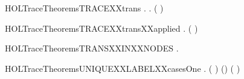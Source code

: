 \newcommand{\HOLTraceTheoremsTRACEXXstrongind}{\UseVerbatim{HOLTraceTheoremsTRACEXXstrongind}}
\begin{SaveVerbatim}{HOLTraceTheoremsTRACEXXtrans}
\HOLTokenTurnstile{} \HOLSymConst{\HOLTokenForall{}}  .     \HOLSymConst{\HOLTokenImp{}} \HOLSymConst{\HOLTokenForall{}} .     \HOLSymConst{\HOLTokenImp{}}   ( \HOLSymConst{++} ) 
\end{SaveVerbatim}
\newcommand{\HOLTraceTheoremsTRACEXXtrans}{\UseVerbatim{HOLTraceTheoremsTRACEXXtrans}}
\begin{SaveVerbatim}{HOLTraceTheoremsTRACEXXtransXXapplied}
\HOLTokenTurnstile{} \HOLSymConst{\HOLTokenForall{}}    .
           \HOLSymConst{\HOLTokenConj{}}     \HOLSymConst{\HOLTokenImp{}}   ( \HOLSymConst{++} ) 
\end{SaveVerbatim}
\newcommand{\HOLTraceTheoremsTRACEXXtransXXapplied}{\UseVerbatim{HOLTraceTheoremsTRACEXXtransXXapplied}}
\begin{SaveVerbatim}{HOLTraceTheoremsTRANSXXINXXNODES}
\HOLTokenTurnstile{} \HOLSymConst{\HOLTokenForall{}}  .  \HOLTokenTransBegin{}\HOLTokenTransEnd {} \HOLSymConst{\HOLTokenImp{}}  \HOLConst{\HOLTokenIn{}}  
\end{SaveVerbatim}
\newcommand{\HOLTraceTheoremsTRANSXXINXXNODES}{\UseVerbatim{HOLTraceTheoremsTRANSXXINXXNODES}}
\begin{SaveVerbatim}{HOLTraceTheoremsUNIQUEXXLABELXXcasesOne}
\HOLTokenTurnstile{} \HOLSymConst{\HOLTokenForall{}} .
        ( ) (\HOLConst{\ensuremath{\tau}}\HOLSymConst{::}) \HOLSymConst{\HOLTokenEquiv{}}
        ( ) 
\end{SaveVerbatim}
\newcommand{\HOLTraceTheoremsUNIQUEXXLABELXXcasesOne}{\UseVerbatim{HOLTraceTheoremsUNIQUEXXLABELXXcasesOne}}
